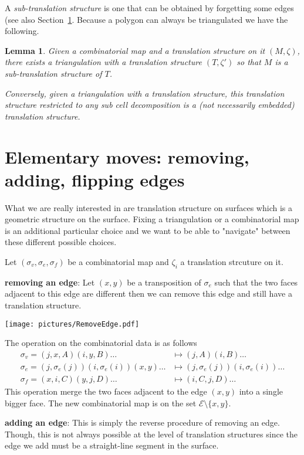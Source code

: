 \documentclass{article}
\def\cE{\mathcal{E}}
\newtheorem{lemma}[definition]{Lemma}
\begin{document}
A \emph{sub-translation structure} is one that can be obtained by forgetting
some edges (see also Section~\ref{sec:ElementaryMoves}. Because a polygon can always be triangulated we have the following.
\begin{lemma}
Given a combinatorial map and a translation structure on it $(M,\zeta)$, there
exists a triangulation with a translation structure $(T,\zeta')$ so that $M$ is
a sub-translation structure of $T$.

Conversely, given a triangulation with a translation structure, this translation
structure restricted to any sub cell decomposition is a (not necessarily embedded)
translation structure.
\end{lemma}

\section{Elementary moves: removing, adding, flipping edges}
\label{sec:ElementaryMoves}
What we are really interested in are translation structure on surfaces which
is a geometric structure on the surface. Fixing a triangulation or a combinatorial
map is an additional particular choice and we want to be able to "navigate" between
these different possible choices.

Let $(\sigma_v, \sigma_e, \sigma_f)$ be a combinatorial map and $\zeta_i$ a
translation strcuture on it.

\textbf{removing an edge}:
Let $(x,y)$ be a transposition of $\sigma_e$ such that the two faces adjacent to this
edge are different then we can remove this edge and still have a translation structure.
\begin{center}\texttt{[image: pictures/RemoveEdge.pdf]}\end{center}
The operation on the combinatorial data is as follows
\begin{align*}
\sigma_v = (j,x,A) (i,y,B) \ldots & \mapsto (j,A) (i,B) \ldots \\
\sigma_e = (j, \sigma_e(j)) (i, \sigma_e(i)) (x,y) \ldots & \mapsto (j, \sigma_e(j)) (i, \sigma_e(i)) \ldots \\
\sigma_f = (x,i,C) (y,j,D) \ldots & \mapsto (i,C,j,D) \ldots 
\end{align*} 
This operation merge the two faces adjacent to the edge $(x,y)$ into a single bigger face.
The new combinatorial map is on the set $\cE \setminus \{x,y\}$.

\textbf{adding an edge}:
This is simply the reverse procedure of removing an edge. Though, this is not always possible at the
level of translation structures since the edge we add must be a straight-line segment
in the surface.
\end{document}
